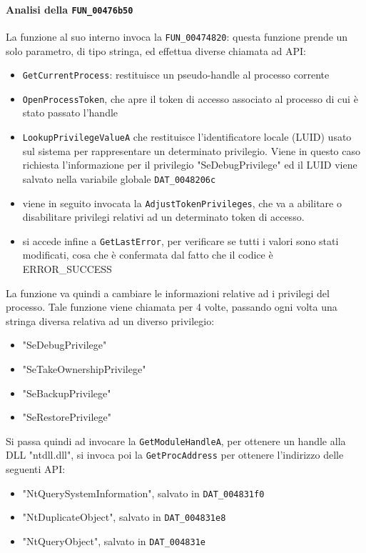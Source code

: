 \documentclass[12pt]{extarticle}
\begin{document}
\paragraph{Analisi della \texttt{FUN\_00476b50}}
La funzione al suo interno invoca la \texttt{FUN\_00474820}: questa funzione prende un solo parametro, di tipo stringa, ed effettua diverse chiamata ad API:
\begin{itemize}
    \item \texttt{GetCurrentProcess}: restituisce un pseudo-handle al processo corrente
    \item \texttt{OpenProcessToken}, che apre il token di accesso associato al processo di cui è stato passato l'handle
    \item \texttt{LookupPrivilegeValueA} che restituisce l'identificatore locale (LUID) usato sul sistema per rappresentare un determinato privilegio. Viene in questo caso richiesta l'informazione per il privilegio "SeDebugPrivilege" ed il LUID viene salvato nella variabile globale \texttt{DAT\_0048206c}
    \item viene in seguito invocata la \texttt{AdjustTokenPrivileges}, che va a abilitare o disabilitare privilegi relativi ad un determinato token di accesso.
    \item si accede infine a \texttt{GetLastError}, per verificare se tutti i valori sono stati modificati, cosa che è confermata dal fatto che il codice è ERROR\_SUCCESS
\end{itemize}
La funzione va quindi a cambiare le informazioni relative ad i privilegi del processo. Tale funzione viene chiamata per 4 volte, passando ogni volta una stringa diversa relativa ad un diverso privilegio:
\begin{itemize}
    \item "SeDebugPrivilege"
    \item "SeTakeOwnershipPrivilege"
    \item "SeBackupPrivilege"
    \item "SeRestorePrivilege"
\end{itemize}
Si passa quindi ad invocare la \texttt{GetModuleHandleA}, per ottenere un handle alla DLL "ntdll.dll", si invoca poi la \texttt{GetProcAddress} per ottenere l'indirizzo delle seguenti API:
\begin{itemize}
    \item "NtQuerySystemInformation", salvato in \texttt{DAT\_004831f0}
    \item "NtDuplicateObject", salvato in \texttt{DAT\_004831e8}
    \item "NtQueryObject", salvato in \texttt{DAT\_004831e}
\end{itemize}
\end{document}
